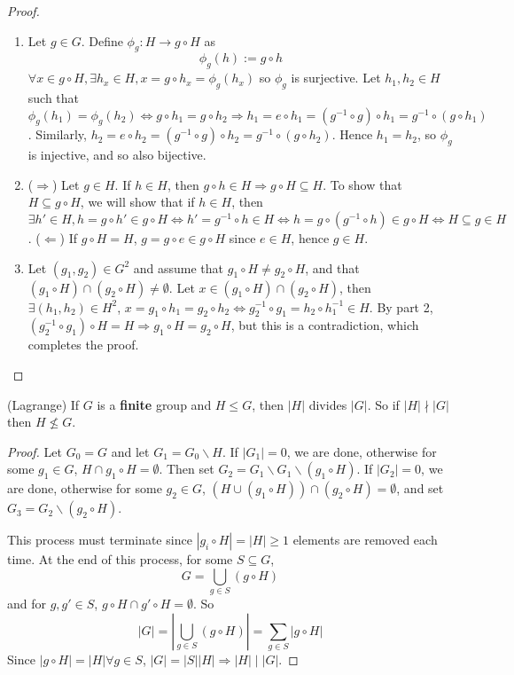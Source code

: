 \begin{proof}
	\hfill
	\begin{enumerate}
		\item Let $g \in G$. Define $\phi_g: H \rightarrow g \circ H$ as
		\[
			\phi_g(h) := g \circ h
		\]
		$\forall x \in g \circ H, \exists h_x \in H, x = g \circ h_x = \phi_g(h_x)$ so $\phi_g$ is surjective. Let $h_1, h_2 \in H$ such that $\phi_g(h_1) = \phi_g(h_2) \Leftrightarrow g \circ h_1 = g \circ h_2 \Rightarrow h_1 = e \circ h_1 = (g^{-1} \circ g) \circ h_1 = g^{-1} \circ (g \circ h_1)$. Similarly, $h_2 = e \circ h_2 = (g^{-1} \circ g) \circ h_2 = g^{-1} \circ (g \circ h_2)$. Hence $h_1 = h_2$, so $\phi_g$ is injective, and so also bijective.
		\item ($\Rightarrow$) Let $g \in H$. If $h \in H$, then $g \circ h \in H \Longrightarrow g \circ H \subseteq H$. To show that $H \subseteq g \circ H$, we will show that if $h \in H$, then $\exists h' \in H, h = g \circ h' \in g \circ H \Longleftrightarrow h' = g^{-1} \circ h \in H \Longleftrightarrow h = g \circ (g^{-1} \circ h) \in g \circ H \Longleftrightarrow H \subseteq g \in H$.
		($\Leftarrow$) If $g \circ H = H$, $g = g \circ e \in g \circ H$ since $e \in H$, hence $g \in H$.
		\item Let $(g_1, g_2) \in G^2$ and assume that $g_1 \circ H \ne g_2 \circ H$, and that $(g_1 \circ H) \cap (g_2 \circ H) \ne \emptyset$. Let $x \in (g_1 \circ H) \cap (g_2 \circ H)$, then $\exists (h_1, h_2) \in H^2$, $x = g_1 \circ h_1 = g_2 \circ h_2 \Longleftrightarrow g_2^{-1} \circ g_1 = h_2 \circ h_1^{-1} \in H$. By part 2, $(g_2^{-1} \circ g_1) \circ H = H \Longrightarrow g_1 \circ H = g_2 \circ H$, but this is a contradiction, which completes the proof.
	\end{enumerate}
\end{proof}
		
\begin{theorem}
	(Lagrange) If $G$ is a \textbf{finite} group and $H \le G$, then $|H|$ divides $|G|$. So if $|H| \nmid |G|$ then $H \not\le G$.
\end{theorem}

\begin{proof}
	Let $G_0 = G$ and let $G_1 = G_0 \backslash H$. If $|G_1| = 0$, we are done, otherwise for some $g_1 \in G$, $H \cap g_1 \circ H = \emptyset$. Then set $G_2 = G_1 \backslash G_1 \backslash (g_1 \circ H)$. If $|G_2| = 0$, we are done, otherwise for some $g_2 \in G$, $(H \cup (g_1 \circ H)) \cap (g_2 \circ H) = \emptyset$, and set $G_3 = G_2 \backslash (g_2 \circ H)$.

	This process must terminate since $|g_i \circ H| = |H| \ge 1$ elements are removed each time. At the end of this process, for some $S \subseteq G$,
	\[
		G = \bigcup_{g \in S} (g \circ H)
	\]
	and for $g, g' \in S$, $g \circ H \cap g' \circ H = \emptyset$. So
	\[
		|G| = \left| \bigcup_{g \in S} (g \circ H) \right| = \sum_{g \in S} | g \circ H |
	\]
	Since $|g \circ H| = |H| \forall g \in S$, $|G| = |S| |H| \Longrightarrow |H| \mid |G|$.
\end{proof}

